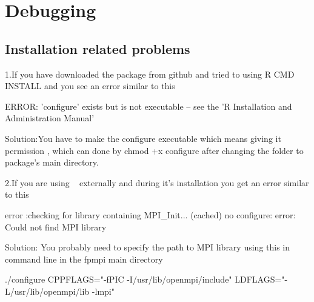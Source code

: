 \section{Debugging }
\label{sec:debug}


\subsection{Installation related problems}

1.If you have downloaded the package from github and tried to using R CMD INSTALL  and you see an error similar to this
\begin{Output}
ERROR: 'configure' exists but is not executable -- see the 'R Installation and Administration Manual'
\end{Output}
Solution:You have to make the configure executable which means giving it permission , which can done by chmod +x configure after changing the folder to package's main directory.

2.If you are using ~\citep{fpmpi} externally and during it's installation you get an error similar to this
\begin{Output}
error :checking for library containing MPI_Init... (cached) no configure: 
error: Could not find MPI library
\end{Output}
Solution: You probably need to specify the path to MPI library using this in command line in the fpmpi main directory
\begin{Code}
./configure CPPFLAGS="-fPIC -I/usr/lib/openmpi/include" LDFLAGS="-L/usr/lib/openmpi/lib -lmpi"
\end{Code}


